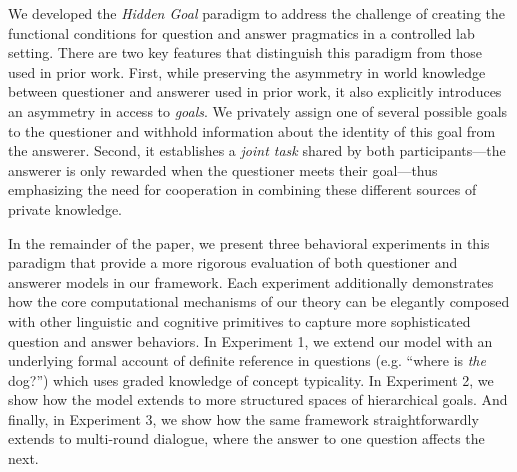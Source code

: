 \documentclass[11pt, floatsintext]{apa6}
\begin{document}
We developed the \emph{Hidden Goal} paradigm to address the challenge of creating the functional conditions for question and answer pragmatics in a controlled lab setting.
There are two key features that distinguish this paradigm from those used in prior work.
First, while preserving the asymmetry in world knowledge between questioner and answerer used in prior work, it also explicitly introduces an asymmetry in access to \emph{goals}.
We privately assign one of several possible goals to the questioner and withhold information about the identity of this goal from the answerer. 
Second, it establishes a \emph{joint task} shared by both participants---the answerer is only rewarded when the questioner meets their goal---thus emphasizing the need for cooperation in combining these different sources of private knowledge. 



In the remainder of the paper, we present three behavioral experiments in this paradigm that provide a more rigorous evaluation of both questioner and answerer models in our framework.
Each experiment additionally demonstrates how the core computational mechanisms of our theory can be elegantly composed with other linguistic and cognitive primitives to capture more sophisticated question and answer behaviors.
In Experiment 1, we extend our model with an underlying formal account of definite reference in questions (e.g. ``where is \emph{the} dog?'') which uses graded knowledge of concept typicality.
In Experiment 2, we show how the model extends to more structured spaces of hierarchical goals.
And finally, in Experiment 3, we show how the same framework straightforwardly extends to multi-round dialogue, where the answer to one question affects the next.
\end{document}
